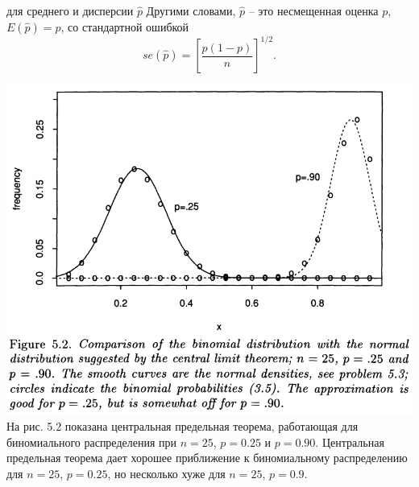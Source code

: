 для среднего и дисперсии $\hat p$ Другими словами, $\hat p$ -- это несмещенная оценка $p$, $E (\hat p) = p$, со стандартной ошибкой 
\begin{equation}
    se(\hat p)=\left[\frac{p(1-p)}{n}\right]^{1/2}.
\end{equation}
\newline

\noindent
\includegraphics[width=\linewidth]{4/f52.png}
\newline
На рис. 5.2 показана центральная предельная теорема, работающая для биномиального распределения при $n = 25$, $p = 0.25$ и $p = 0.90$. Центральная предельная теорема дает хорошее приближение к биномиальному распределению для $n = 25$, $p = 0.25$, но несколько хуже для $n = 25$, $p = 0.9$. 